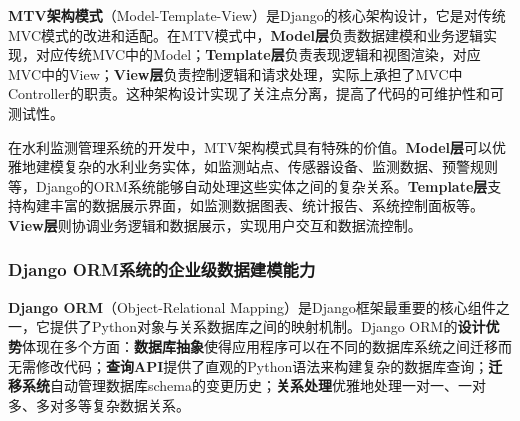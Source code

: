 \textbf{MTV架构模式}（Model-Template-View）是Django的核心架构设计，它是对传统MVC模式的改进和适配。在MTV模式中，\textbf{Model层}负责数据建模和业务逻辑实现，对应传统MVC中的Model；\textbf{Template层}负责表现逻辑和视图渲染，对应MVC中的View；\textbf{View层}负责控制逻辑和请求处理，实际上承担了MVC中Controller的职责。这种架构设计实现了关注点分离，提高了代码的可维护性和可测试性。

在水利监测管理系统的开发中，MTV架构模式具有特殊的价值。\textbf{Model层}可以优雅地建模复杂的水利业务实体，如监测站点、传感器设备、监测数据、预警规则等，Django的ORM系统能够自动处理这些实体之间的复杂关系。\textbf{Template层}支持构建丰富的数据展示界面，如监测数据图表、统计报告、系统控制面板等。\textbf{View层}则协调业务逻辑和数据展示，实现用户交互和数据流控制。

\begin{Shaded}
\begin{Highlighting}[]

\OperatorTok{=}\OperatorTok{=}\NormalTok{)}
\OperatorTok{=}
\OperatorTok{=}\OperatorTok{=}
    
\OperatorTok{=}\OperatorTok{=}
\OperatorTok{=}
\OperatorTok{=}\OperatorTok{=}\NormalTok{)}
\end{Highlighting}
\end{Shaded}

\subsubsection{Django ORM系统的企业级数据建模能力}\label{django-ormux7cfbux7edfux7684ux4f01ux4e1aux7ea7ux6570ux636eux5efaux6a21ux80fdux529b}

\textbf{Django ORM}（Object-Relational Mapping）是Django框架最重要的核心组件之一，它提供了Python对象与关系数据库之间的映射机制。Django ORM的\textbf{设计优势}体现在多个方面：\textbf{数据库抽象}使得应用程序可以在不同的数据库系统之间迁移而无需修改代码；\textbf{查询API}提供了直观的Python语法来构建复杂的数据库查询；\textbf{迁移系统}自动管理数据库schema的变更历史；\textbf{关系处理}优雅地处理一对一、一对多、多对多等复杂数据关系。

